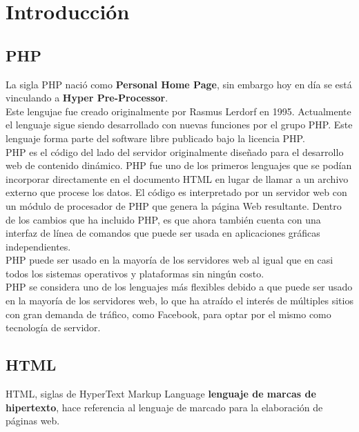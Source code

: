 \section{Introducción}

\subsection{PHP}

La sigla PHP nació como \textbf{Personal Home Page}, sin embargo hoy en día se está vinculando a \textbf{Hyper Pre-Processor}. \\ Este lengujae fue creado originalmente por Rasmus Lerdorf en 1995. Actualmente el lenguaje sigue siendo desarrollado con nuevas funciones por el grupo PHP. Este lenguaje forma parte del software libre publicado bajo la licencia PHP.\\

PHP es el código del lado del servidor originalmente diseñado para el desarrollo web de contenido dinámico. PHP fue uno de los primeros lenguajes que se podían incorporar directamente en el documento HTML en lugar de llamar a un archivo externo que procese los datos. El código es interpretado por un servidor web con un módulo de procesador de PHP que genera la página Web resultante. Dentro de los cambios que ha incluido PHP, es que ahora también cuenta con una interfaz de línea de comandos que puede ser usada en aplicaciones gráficas independientes. \\

PHP puede ser usado en la mayoría de los servidores web al igual que en casi todos los sistemas operativos y plataformas sin ningún costo.\\

PHP se considera uno de los lenguajes más flexibles debido a que puede ser usado en la mayoría de los servidores web, lo que ha atraído el interés de múltiples sitios con gran demanda de tráfico, como Facebook, para optar por el mismo como tecnología de servidor.\\

\subsection{HTML}

HTML, siglas de HyperText Markup Language \textbf{lenguaje de marcas de hipertexto}, hace referencia al lenguaje de marcado para la elaboración de páginas web. \\

